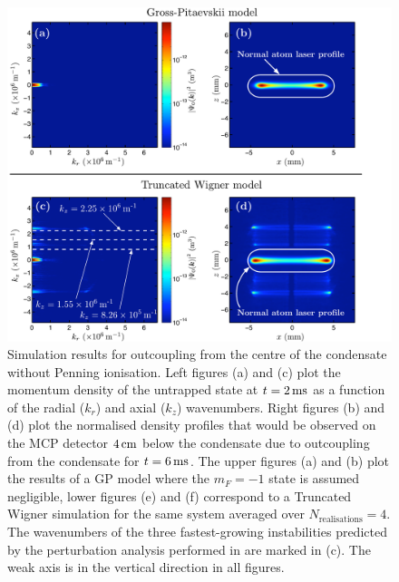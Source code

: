 \begin{figure}
    \centering
    \includegraphics[trim=0 0 52 0,width=14cm]{ResonantOutcouplingNoPI}
    \caption{Simulation results for outcoupling from the centre of the condensate without Penning ionisation. Left figures (a) and (c) plot the momentum density of the untrapped state at $t=\unit[2]{ms}$ as a function of the radial ($k_r$) and axial ($k_z$) wavenumbers. Right figures (b) and (d) plot the normalised density profiles that would be observed on the MCP detector $\unit[4]{cm}$ below the condensate due to outcoupling from the condensate for $t=\unit[6]{ms}$. The upper figures (a) and (b) plot the results of a GP model where the $m_F=-1$ state is assumed negligible, lower figures (e) and (f) correspond to a Truncated Wigner simulation for the same system averaged over $N_\text{realisations} = 4$. The wavenumbers of the three fastest-growing instabilities predicted by the perturbation analysis performed in  are marked in (c). The weak axis is in the vertical direction in all figures.\label{Peaks:TheoryZeroDetuningNoPIResults}}
\end{figure}

